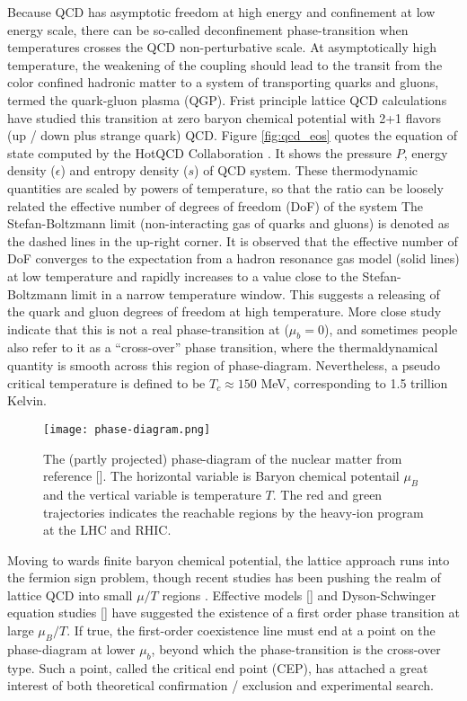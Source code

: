 Because QCD has asymptotic freedom at high energy and confinement at low energy scale, there can be so-called deconfinement phase-transition when temperatures crosses the QCD non-perturbative scale.
At asymptotically high temperature, the weakening of the coupling should lead to the transit from the color confined hadronic matter to a system of transporting quarks and gluons, termed the quark-gluon plasma (QGP). 
Frist principle lattice QCD calculations have studied this transition at zero baryon chemical potential with 2+1 flavors (up / down plus strange quark) QCD.
Figure \ref{fig:qcd_eos} quotes the equation of state computed by the HotQCD Collaboration \cite{Bazavov:2014pvz}.
It shows the pressure $P$, energy density ($\epsilon$) and entropy density ($s$) of QCD system.
These thermodynamic quantities are scaled by powers of temperature, so that the ratio can be loosely related the effective number of degrees of freedom (DoF) of the system
The Stefan-Boltzmann limit (non-interacting gas of quarks and gluons) is denoted as the dashed lines in the up-right corner.
It is observed that the effective number of DoF converges to the expectation from a hadron resonance gas model (solid lines) at low temperature and rapidly increases to a value close to the Stefan-Boltzmann limit in a narrow temperature window.
This suggests a releasing of the quark and gluon degrees of freedom at high temperature.
More close study indicate that this is not a real phase-transition at ($\mu_b = 0$), and sometimes people also refer to it as a ``cross-over'' phase transition, where the thermaldynamical quantity is smooth across this region of phase-diagram.
Nevertheless, a pseudo critical temperature is defined to be $T_c \approx 150 $ MeV, corresponding to 1.5 trillion Kelvin.

\begin{figure}
    \centering
    \texttt{[image: phase-diagram.png]}
    \caption{The (partly projected) phase-diagram of the nuclear matter from reference []. The horizontal variable is Baryon chemical potentail $\mu_B$ and the vertical variable is temperature $T$. The red and green trajectories indicates the reachable regions by the heavy-ion program at the LHC and RHIC.}
    \label{fig:phase-diagram}
\end{figure}

Moving to wards finite baryon chemical potential, the lattice approach runs into the fermion sign problem, though recent studies has been pushing the realm of lattice QCD into small $\mu/T$ regions \cite{Gunther:2016vcp,Bazavov:2017dus}.
Effective models [] and Dyson-Schwinger equation studies [] have suggested the existence of a first order phase transition at large $\mu_B/T$.
If true, the first-order coexistence line must end at a point on the phase-diagram at lower $\mu_b$, beyond which the phase-transition is the cross-over type.
Such a point, called the critical end point (CEP), has attached a great interest of both theoretical confirmation / exclusion and experimental search.

